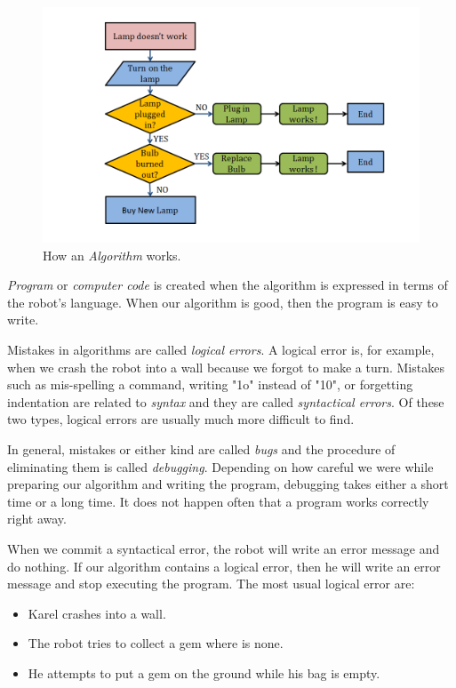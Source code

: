 \begin{figure}[!ht]
\begin{center}
\includegraphics[height=0.6\textwidth]{imgk/algo.png}
\end{center}
\vspace{-4mm}
\caption{How an  {\em Algorithm} works.}
\label{fig:algo}
\vspace{-4mm}
\end{figure}

{\em Program} or {\em computer code} is created when the algorithm is expressed
in terms of the robot's language. When our algorithm is good, then 
the program is easy to write.

Mistakes in algorithms are called {\em logical errors}. A logical error is, for 
example, when we crash the robot into a wall because we forgot to make a turn.
Mistakes such as mis-spelling a command, writing "1o" instead of "10", or forgetting 
indentation are related to 
{\em syntax} and they are called {\em syntactical errors}. Of these two types, 
logical errors are usually much more difficult to find. 

In general, mistakes or either kind are called {\em bugs} and the procedure of 
eliminating them is called {\em debugging}. Depending on how careful we 
were while preparing our algorithm and writing the program, debugging takes either 
a short time or a long time. It does not happen often that a program works correctly
right away. 

When we commit a syntactical error,
the robot will write an error message and do nothing.
If our algorithm contains a logical error, then he will
write an error message and stop executing the program. 
The most usual logical error are:

\begin{itemize}
\item Karel crashes into a wall.
\item The robot tries to collect a gem where is none.
\item He attempts to put a gem on the ground while his bag is empty.
\end{itemize}


